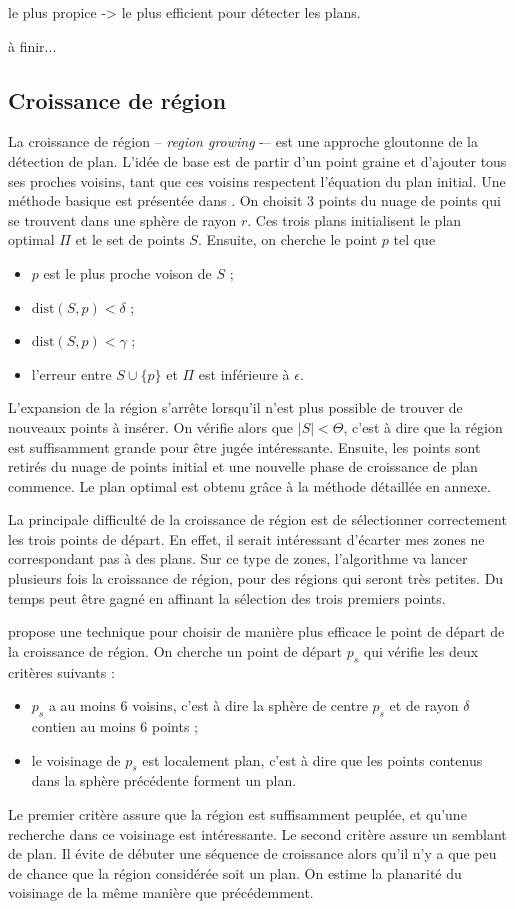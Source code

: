 ﻿\documentclass[12pt, twoside]{article}
\begin{document}
le plus propice -> le plus efficient pour détecter les plans.

à finir...

\subsection{Croissance de région}
La croissance de région -- \textit{region growing} -– est une approche gloutonne de la détection de plan. L’idée de base est de partir d’un point graine et d’ajouter tous ses proches voisins, tant que ces voisins respectent l’équation du plan initial. Une méthode basique est présentée dans \cite{reggrow1}. On choisit 3 points du nuage de points qui se trouvent dans une sphère de rayon $r$. Ces trois plans initialisent le plan optimal $\Pi$ et le set de points $S$. Ensuite, on cherche le point $p$ tel que
\begin{itemize}
  \item $p$ est le plus proche voison de $S$ ;
  \item $\text{dist}(S,p) < \delta$ ;
  \item $\text{dist}(S,p) < \gamma$ ;
  \item l'erreur entre $S\cup\{p\}$ et $\Pi$ est inférieure à $\epsilon$.
\end{itemize}

L'expansion de la région s'arrête lorsqu'il n'est plus possible de trouver de nouveaux points à insérer. On vérifie alors que $\vert S\vert < \Theta$, c'est à dire que la région est suffisamment grande pour être jugée intéressante. Ensuite, les points sont retirés du nuage de points initial et une nouvelle phase de croissance de plan commence. Le plan optimal est obtenu grâce à la méthode détaillée en annexe.

La principale difficulté de la croissance de région est de sélectionner correctement les trois points de départ. En effet, il serait intéressant d'écarter mes zones ne correspondant pas à des plans. Sur ce type de zones, l'algorithme va lancer plusieurs fois la croissance de région, pour des régions qui seront très petites. Du temps peut être gagné en affinant la sélection des trois premiers points.

\cite{reggrow2} propose une technique pour choisir de manière plus efficace le point de départ de la croissance de région. On cherche un point de départ $p_s$ qui vérifie les deux critères suivants :
\begin{itemize}
  \item $p_s$ a au moins 6 voisins, c'est à dire la sphère de centre $p_s$ et de rayon $\delta$ contien au moins 6 points ;
  \item le voisinage de $p_s$ est localement plan, c'est à dire que les points contenus dans la sphère précédente forment un plan.
\end{itemize}
Le premier critère assure que la région est suffisamment peuplée, et qu’une recherche dans ce voisinage est intéressante. Le second critère assure un semblant de plan. Il évite de débuter une séquence de croissance alors qu’il n’y a que peu de chance que la région considérée soit un plan. On estime la planarité du voisinage de la même manière que précédemment.
\end{document}
